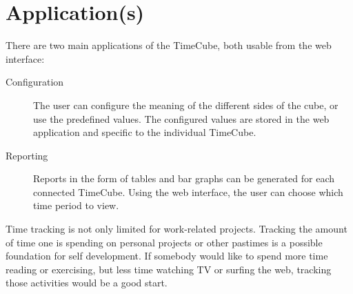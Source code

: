 \section{Application(s)}

There are two main applications of the TimeCube, both usable from the web interface:

\begin{description}
    \item[Configuration] The user can configure the meaning of the different sides of the cube, or use the predefined values. The configured values are stored in the web application and specific to the individual TimeCube.
    \item[Reporting] Reports in the form of tables and bar graphs can be generated for each connected TimeCube. Using the web interface, the user can choose which time period to view.
\end{description}

Time tracking is not only limited for work-related projects. Tracking the amount of time one is spending on personal projects or other pastimes is a possible foundation for self development. If somebody would like to spend more time reading or exercising, but less time watching TV or surfing the web, tracking those activities would be a good start.
